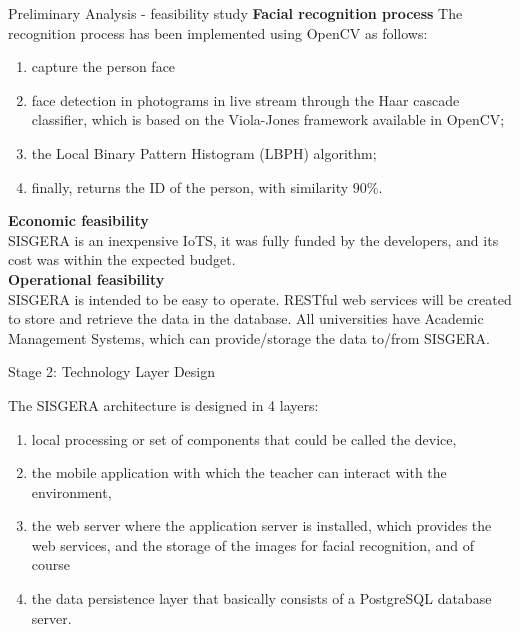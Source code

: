 \documentclass[notes=show, 10pt]{beamer}
\begin{document}
    \begin{frame}{Preliminary Analysis - feasibility study}
            \textbf{Facial recognition process}
            The recognition process has been implemented using OpenCV as follows:
            \begin{enumerate}
                \item capture the person face
                \item face detection in photograms in live stream through the Haar cascade classifier, which is based on the Viola-Jones framework available in OpenCV;
                \item the Local Binary Pattern Histogram (LBPH) algorithm;
                \item finally, returns the ID of the person, with similarity 90\%.
            \end{enumerate}
            \textbf{Economic feasibility}\\
            SISGERA is an inexpensive IoTS, it was fully funded by the developers, and its cost was within the expected budget.\\
        
            \textbf{Operational feasibility}\\
            SISGERA is intended to be easy to operate. RESTful web services will be created to store and retrieve the data in the database. All universities have Academic Management Systems, which can provide/storage the data to/from SISGERA.
    \end{frame}

    \begin{frame}{Stage 2: Technology Layer Design}
        \begin{block}{The SISGERA architecture is designed in 4 layers:}
        \begin{enumerate}
            \item local processing or set of components that could be called the device,
            \item the mobile application with which the teacher can interact with the environment,
            \item the web server where the application server is installed, which provides the web services, and the storage of the images for facial recognition, and of course
            \item the data persistence layer that basically consists of a PostgreSQL database server.
        \end{enumerate} 
        \end{block}
    \end{frame}
    
\end{document}
